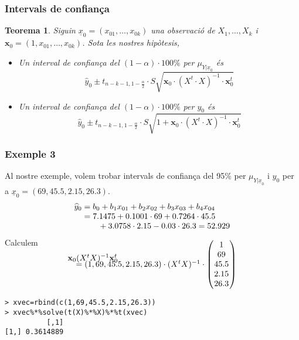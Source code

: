 \documentclass[12pt,t]{beamer}
\theoremstyle{plain}
\newtheorem{teorema}{Teorema}
\theoremstyle{definition}
\begin{document}
\begin{frame}
\frametitle{Intervals de confiança}
\begin{teorema}
Siguin $\underline{x}_0=(x_{01},\ldots,x_{0k})$ una observació de $X_1,\ldots,X_k$ i $\mathbf{x}_0=(1,x_{01},\ldots,x_{0k})$. 
Sota les nostres hipòtesis, 
\medskip

\begin{itemize}

\item Un interval de confiança del $(1-\alpha)\cdot 100\%$ per $\mu_{Y|\underline{x}_0}$ és
$$
\widehat{y}_0\pm t_{n-k-1,1-\frac{\alpha}{2}}\cdot S\sqrt{\mathbf{x}_0\cdot(X^t  \cdot X)^{-1}\cdot \mathbf{x}_0^t}
$$
\medskip

\item Un interval de confiança del $(1-\alpha)\cdot 100\%$ per $y_0$ és
$$
\widehat{y}_0\pm t_{n-k-1,1-\frac{\alpha}{2}}\cdot S\sqrt{1+\mathbf{x}_0\cdot(X^t  \cdot X)^{-1}\cdot \mathbf{x}_0^t}
$$
\end{itemize}
\end{teorema}
\end{frame}

\begin{frame}[fragile]
\frametitle{Exemple 3}
Al nostre exemple, volem trobar intervals de confiança del 95\% per $\mu_{Y|\underline{x}_0}$ i ${y}_0$ per a $\underline{x}_0=(69,45.5,2.15,26.3)$.
$$
\begin{array}{l}
\widehat{y}_0=b_0+b_1x_{01}+b_2x_{02}+b_3x_{03}+b_4x_{04}\\
\hphantom{\widehat{y}_0}=7.1475+0.1001\cdot 69 +0.7264\cdot 45.5\\
\hphantom{\widehat{y}_0}\qquad +3.0758\cdot 2.15 -0.03\cdot 26.3= 52.929
\end{array}
$$
Calculem 
$$
\begin{array}{l}
\mathbf{x}_0 (X^t X)^{-1} \mathbf{x}_0^t\\[-1cm]
\quad =(1,69,45.5,2.15,26.3)\cdot (X^t X)^{-1}\cdot \left(\hspace*{-1ex}\begin{array}{c}
1\\ 69 \\ 45.5\\ 2.15 \\ 26.3\end{array}\hspace*{-1ex}
\right)
\end{array}
$$
\begin{verbatim}
> xvec=rbind(c(1,69,45.5,2.15,26.3))
> xvec%*%solve(t(X)%*%X)%*%t(xvec)
          [,1]
[1,] 0.3614889
\end{verbatim}
\end{frame}
\end{document}
